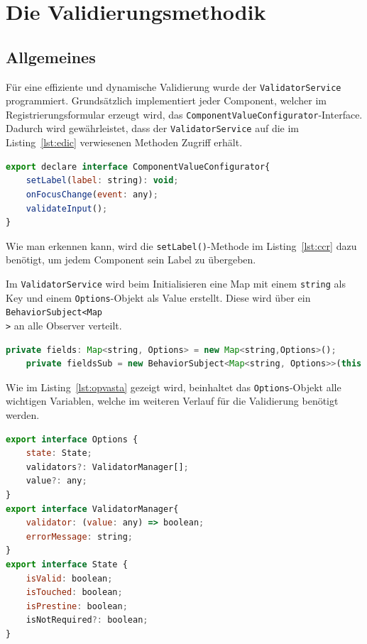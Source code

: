\newpage

\section{Die Validierungsmethodik}
\subsection{Allgemeines}

Für eine effiziente und dynamische Validierung wurde der \texttt{ValidatorService} programmiert. Grundsätzlich implementiert jeder Component, welcher im Registrierungsformular erzeugt wird, das \texttt{ComponentValueConfigurator}-Interface. Dadurch wird gewährleistet, dass der \texttt{ValidatorService} auf die im Listing~\ref{lst:edic} verwiesenen Methoden Zugriff erhält.

\begin{lstlisting}[caption={Methoden aus dem \texttt{ComponentValueConfigurator}-Interface}, language=JavaScript,label={lst:edic}]
export declare interface ComponentValueConfigurator{
	setLabel(label: string): void;
	onFocusChange(event: any);
	validateInput();
}
\end{lstlisting}

Wie man erkennen kann, wird die \texttt{setLabel()}-Methode im Listing~\ref{lst:ccr} dazu benötigt, um jedem Component sein Label zu übergeben.

Im \texttt{ValidatorService} wird beim Initialisieren eine Map mit einem \texttt{string} als Key und einem \texttt{Options}-Objekt als Value erstellt. Diese wird über ein \texttt{BehaviorSubject<Map\\<string, Options>>} an alle Observer verteilt.

\begin{lstlisting}[caption={Die \texttt{fields}-Map und ihr Subject}, language=JavaScript]
	private fields: Map<string, Options> = new Map<string,Options>();
	private fieldsSub = new BehaviorSubject<Map<string, Options>>(this.fields);
\end{lstlisting}

Wie im Listing~\ref{lst:opvasta} gezeigt wird, beinhaltet das \texttt{Options}-Objekt alle wichtigen Variablen, welche im weiteren Verlauf für die Validierung benötigt werden.

\begin{lstlisting}[caption={Das \texttt{Options}-Objekt und seine abhängigen Objekte}, language=JavaScript,label={lst:opvasta}]
export interface Options {
	state: State;
	validators?: ValidatorManager[];
	value?: any;
}
export interface ValidatorManager{
	validator: (value: any) => boolean;
	errorMessage: string;
}
export interface State {
	isValid: boolean;
	isTouched: boolean;
	isPrestine: boolean;
	isNotRequired?: boolean;
}
\end{lstlisting}
